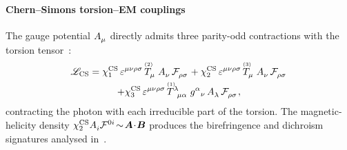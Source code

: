 \paragraph*{Chern--Simons torsion--EM couplings}
\label{ChernSimonsCouplings}
The gauge potential $\FieldA{_\mu}$ directly admits three
parity-odd contractions with the torsion
tensor~\cite{hehl2000electromagnetic,itin2004maxwell,rubilar2003torsion,obukhov2024electrodynamics}:
\begin{multline}
  \lag_\text{CS}
  = \chi^\text{CS}_1\,\varepsilon^{\mu\nu\rho\sigma}\,\T[2]{_\mu}\,\FieldA{_\nu}\,\FieldF{_{\rho\sigma}}
  +\chi^\text{CS}_2\,\varepsilon^{\mu\nu\rho\sigma}\,\T[3]{_\mu}\,\FieldA{_\nu}\,\FieldF{_{\rho\sigma}} \\
  +\chi^\text{CS}_3\,\varepsilon^{\mu\nu\rho\sigma}\,\T[1]{^\lambda_{\mu\alpha}}\,g^\alpha{}_\nu\,\FieldA{_\lambda}\,\FieldF{_{\rho\sigma}},
  \label{ChernSimonsAction}
\end{multline}
contracting the photon with each irreducible part of the torsion.
The magnetic-helicity density
$\chi^\text{CS}_2 \FieldA{_i}\FieldF{^{0i}}\!\sim\!\bm{A}\!\cdot\!\bm{B}$
produces the birefringence and dichroism signatures
analysed in~\cite{rubilar2003torsion,obukhov2024electrodynamics}.

